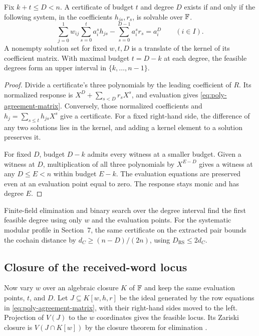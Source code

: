 \begin{proposition}
\label{prop:poly-agreement-boundary}
Fix \(k+t\le D<n\). A certificate of budget \(t\) and degree \(D\) exists
if and only if the following system, in the coefficients \(h_{js},r_s\),
is solvable over \(\mathbb{F}\).
\begin{equation}\label{eq:poly-agreement-matrix}
  \sum_{j=0}^1 w_{ij}\sum_{s=0}^{t}a_i^s h_{js}
       -\sum_{s=0}^{D-1} a_i^s r_s=a_i^D
       \qquad(i\in I).
\end{equation}
A nonempty solution set for fixed \(w,t,D\) is a translate of the kernel
of its coefficient matrix. With maximal budget \(t=D-k\) at each degree,
the feasible degrees form an upper interval in \(\{k,\ldots,n-1\}\).
\end{proposition}
\begin{proof}
Divide a certificate's three polynomials by the leading coefficient of
\(R\). Its normalized response is \(X^D+\sum_{s<D}r_sX^s\), and evaluation
gives \cref{eq:poly-agreement-matrix}. Conversely, those normalized
coefficients and \(h_j=\sum_{s\le t}h_{js}X^s\) give a certificate.
For a fixed right-hand side, the difference of any two solutions lies in
the kernel, and adding a kernel element to a solution preserves it.

For fixed \(D\), budget \(D-k\) admits every witness at a smaller budget.
Given a witness at \(D\), multiplication of all three polynomials by
\(X^{E-D}\) gives a witness at any \(D\le E<n\) within budget \(E-k\).
The evaluation equations are preserved even at an evaluation point equal
to zero. The response stays monic and has degree \(E\).
\end{proof}

Finite-field elimination and binary search over the degree interval find
the first feasible degree using only \(w\) and the evaluation points. For
the systematic modular profile in Section~7, the same certificate on the
extracted pair bounds the cochain distance by \(d_C\ge(n-D)/(2n)\), using
\(D_{\mathrm{RS}}\le2d_C\).

\subsection{Closure of the received-word locus}

Now vary \(w\) over an algebraic closure \(K\) of \(\mathbb{F}\) and keep the same
evaluation points, \(t\), and \(D\). Let \(J\subseteq K[w,h,r]\) be the
ideal generated by the row equations in \cref{eq:poly-agreement-matrix},
with their right-hand sides moved to the left. Projection of \(V(J)\) to
the \(w\) coordinates gives the feasible locus. Its Zariski closure is
\(V(J\cap K[w])\) by the closure theorem for elimination
\cite[Theorem~6.17.1]{setiabrata2019computationalAlgebra}.

